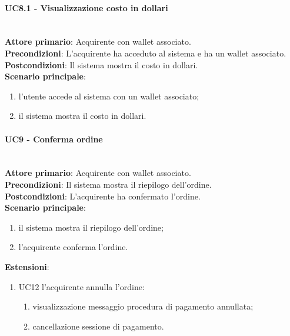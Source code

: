 \documentclass[a4paper, 12pt]{article}
\begin{document}
\paragraph{UC8.1 - Visualizzazione costo in dollari}\\
\textbf{Attore primario}: Acquirente con wallet associato.\\
\textbf{Precondizioni}: L'acquirente ha acceduto al sistema e ha un wallet associato.\\
\textbf{Postcondizioni}: Il sistema mostra il costo in dollari.\\
\textbf{Scenario principale}:
\begin{enumerate}
    \item l’utente accede al sistema con un wallet associato;
    \item il sistema mostra il costo in dollari.
\end{enumerate}

\paragraph{UC9 - Conferma ordine}\\
\textbf{Attore primario}: Acquirente con wallet associato.\\
\textbf{Precondizioni}: Il sistema mostra il riepilogo dell'ordine.\\
\textbf{Postcondizioni}: L'acquirente ha confermato l'ordine.\\
\textbf{Scenario principale}:
\begin{enumerate}
    \item il sistema mostra il riepilogo dell'ordine;
    \item l'acquirente conferma l'ordine.
\end{enumerate}
\textbf{Estensioni}:
\begin{enumerate}
    \item UC12 l'acquirente annulla l'ordine:
    \begin{enumerate}
        \item visualizzazione messaggio procedura di pagamento annullata;
        \item cancellazione sessione di pagamento.
    \end{enumerate}
\end{enumerate}
\end{document}
